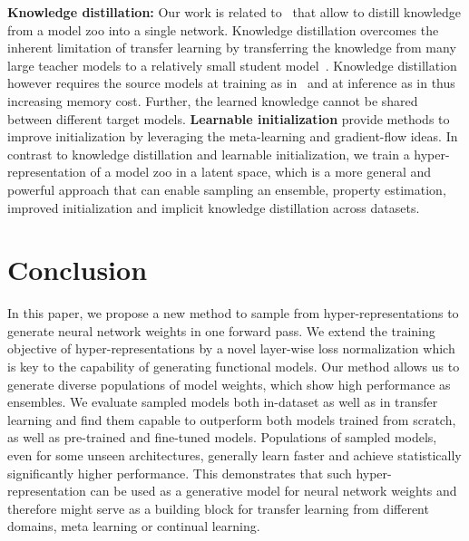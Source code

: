 \documentclass{article}
\begin{document}
\textbf{Knowledge distillation:} Our work is related to~\citep{wang2018adversarial,liuKnowledgeFlowImprove2019,shuZooTuningAdaptiveTransfer2021} that allow to distill knowledge from a model zoo into a single network. Knowledge distillation overcomes the inherent limitation of transfer learning by transferring the knowledge from many large teacher models to a relatively small student model~\citep{liuKnowledgeFlowImprove2019,shuZooTuningAdaptiveTransfer2021}. 
Knowledge distillation however requires the source models at training as in~\citep{liuKnowledgeFlowImprove2019} and at inference as in\citep{shuZooTuningAdaptiveTransfer2021} thus increasing memory cost. Further, the learned knowledge cannot be shared between different target models.
\textbf{Learnable initialization} \citep{dauphinMetaInitInitializingLearning2019,zhu2021gradinit} provide methods to improve initialization by leveraging the meta-learning and gradient-flow ideas.
In contrast to knowledge distillation and learnable initialization, we train a hyper-representation of a model zoo in a latent space, which is a more general and powerful approach that can enable sampling an ensemble, property estimation, improved initialization and implicit knowledge distillation across datasets.



\section{Conclusion}
\label{sec:conclusion}

In this paper, we propose a new method to sample from hyper-representations to generate neural network weights in one forward pass.
We extend the training objective of hyper-representations by a novel layer-wise loss normalization which is key to the capability of generating functional models.
Our method allows us to generate diverse populations of model weights, which show high performance as ensembles.
We evaluate sampled models both in-dataset as well as in transfer learning and find them capable to outperform both models trained from scratch, as well as pre-trained and fine-tuned models.
Populations of sampled models, even for some unseen architectures, generally learn faster and achieve statistically significantly higher performance. 
This demonstrates that such hyper-representation can be used as a generative model for neural network weights and therefore might serve as a building block for transfer learning from different domains, meta learning or continual learning.
\end{document}
